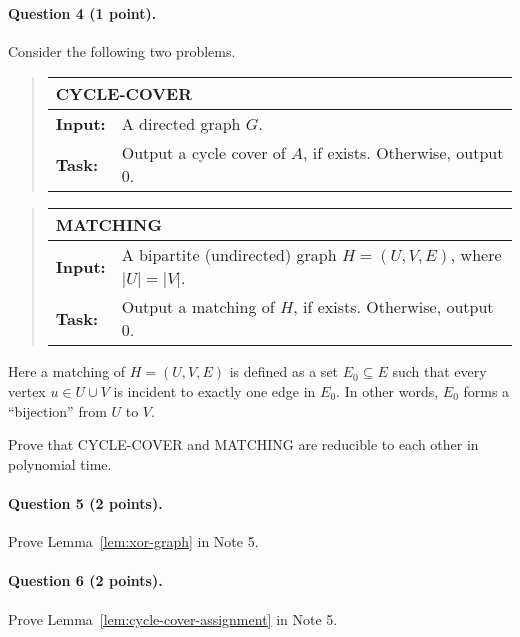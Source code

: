 \documentclass[11pt, a4paper]{article}
\begin{document}
\paragraph*{Question 4 (1 point).}
Consider the following two problems.
\begin{quote}
{\def\arraystretch{1.25}
\begin{tabular}{|ll|}
\hline
\multicolumn{2}{|l|}{{\sf CYCLE-COVER}}
\\
\hline
{\bf Input:}
&
A directed graph $G$.
\\
{\bf Task:}
&
Output a cycle cover of $A$, if exists.
Otherwise, output $0$.
\\
\hline
\end{tabular}}
\end{quote}
\begin{quote}
{\def\arraystretch{1.25}
\begin{tabular}{|ll|}
\hline
\multicolumn{2}{|l|}{{\sf MATCHING}}
\\
\hline
{\bf Input:}
&
A bipartite (undirected) graph $H=(U,V,E)$, where $|U|=|V|$.
\\
{\bf Task:}
&
Output a matching of $H$, if exists.
Otherwise, output $0$.
\\
\hline
\end{tabular}}
\end{quote}
Here a matching of $H=(U,V,E)$ is defined as a set $E_0\subseteq E$
such that every vertex $u \in U\cup V$ is incident to exactly one edge in $E_0$.
In other words, $E_0$ forms a ``bijection'' from $U$ to $V$.

Prove that {\sf CYCLE-COVER} and {\sf MATCHING} are reducible to each other in polynomial time.








\paragraph*{Question 5 (2 points).}
Prove Lemma~\ref{lem:xor-graph} in Note 5.



\paragraph*{Question 6 (2 points).}
Prove Lemma~\ref{lem:cycle-cover-assignment} in Note 5.
\end{document}
